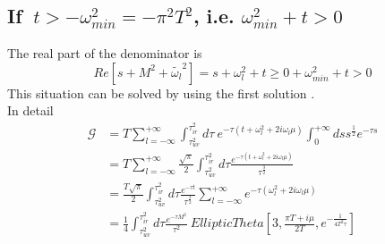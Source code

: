 \documentclass{article}
\begin{document}
\subsection{If \texorpdfstring{$\ t>-\omega_{min}^2=-\pi^2T^2$}{}, i.e. \texorpdfstring{$\omega_{min}^2+t>0$}{}}
The real part of the denominator is
\begin{equation}
    Re\left[s+M^2+\widetilde{\omega_l}^2\right]=s+\omega_l^2+t\geq0+\omega_{min}^2+t>0 
\end{equation}
This situation can be solved by using the first solution .
\\In detail
\begin{equation}
    \begin{split}
        \mathcal{G} &=T \sum_{l=-\infty}^{+\infty} \int_{\tau_{uv}^2}^{\tau_{ir}^2}d\tau\ e^{-\tau \left(t+\omega_l^2+2i\omega_l\mu\right)}  \int_{0}^{+\infty}ds  s^{\frac{1}{2}}e^{-\tau s}\\
        &=T\sum_{l=-\infty}^{+\infty}\frac{\sqrt{\pi}}{2}\int_{\tau_{uv}^2}^{\tau_{ir}^2}d\tau \frac{e^{-\tau\left(t+\omega_l^2+2i\omega_l\mu \right)}}{\tau^{\frac{3}{2}}}\\
        &=\frac{T\sqrt{\pi}}{2}\int_{\tau_{uv}^2}^{\tau_{ir}^2}d\tau \frac{e^{-\tau t}}{\tau^{\frac{3}{2}}}\sum_{l=-\infty}^{+\infty}e^{-\tau \left(\omega_l^2+2i\omega_l\mu\right)}\\
        &=\frac{1}{4}\int_{\tau_{uv}^2}^{\tau_{ir}^2}d\tau \frac{e^{-\tau M^2}}{\tau^2}\  EllipticTheta[3,\frac{\pi T+i\mu}{2T},e^{-\frac{1}{4T^2\tau}}] 
    \end{split}
\end{equation}
\newpage
\end{document}
